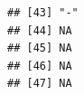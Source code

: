 \documentclass[
]{article}
\begin{document}
\begin{verbatim}
## [43] "-"                                                                                                                                                                                                                                                                                                                                                                                                  
## [44] NA                                                                                                                                                                                                                                                                                                                                                                                                   
## [45] NA                                                                                                                                                                                                                                                                                                                                                                                                   
## [46] NA                                                                                                                                                                                                                                                                                                                                                                                                   
## [47] NA
\end{verbatim}
\end{document}
